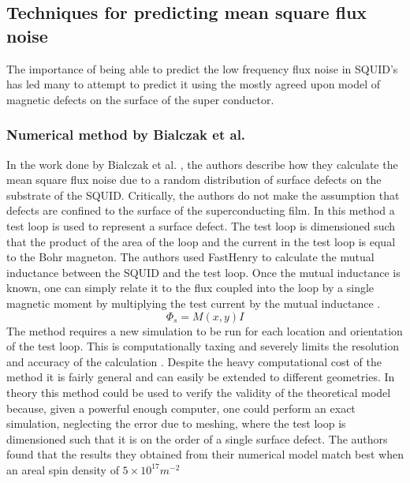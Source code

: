 \subsection{Techniques for predicting mean square flux noise}
\label{subsec:PredictFluxNoise}
The importance of being able to predict the low frequency flux noise in SQUID's has led many to attempt to predict it using the mostly agreed upon model of magnetic defects on the surface of the super conductor.

\subsubsection*{Numerical method by Bialczak et al.}
In the work done by Bialczak et al. \cite{BialczakTestLoop}, the authors describe how they calculate the mean square flux noise due to a random distribution of surface defects on the substrate of the SQUID. Critically, the authors do not make the assumption that defects are confined to the surface of the superconducting film. In this method a test loop is used to represent a surface defect. The test loop is dimensioned such that the product of the area of the loop and the current in the test loop is equal to the Bohr magneton. The authors used FastHenry to calculate the mutual inductance between the SQUID and the test loop. Once the mutual inductance is known, one can simply relate it to the flux coupled into the loop by a single magnetic moment by multiplying the test current by the mutual inductance \cite{BialczakTestLoop}. 
\begin{equation}
    \Phi_s = M(x,y)I
    \label{eq:FluxCoupleBial}
\end{equation}
The method requires a new simulation to be run for each location and orientation of the test loop. This is computationally taxing and severely limits the resolution and accuracy of the calculation \cite{fluxNoiseSquidsStevenAnton}. Despite the heavy computational cost of the method it is fairly general and can easily be extended to different geometries. In theory this method could be used to verify the validity of the theoretical model because, given a powerful enough computer, one could perform an exact simulation, neglecting the error due to meshing, where the test loop is dimensioned such that it is on the order of a single surface defect. The authors found that the results they obtained from their numerical model match best when an areal spin density of $5\times10^{17}\si{m^{-2}}$

